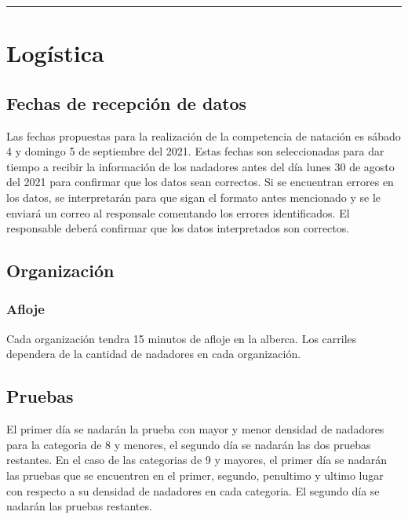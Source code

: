 \hrule
\vspace{0.5cm}
\section{Logística}
\subsection{Fechas de recepción de datos}
Las fechas propuestas para la realización de la competencia de natación es sábado 4 y domingo 5 de septiembre del 2021. Estas fechas son seleccionadas para dar tiempo a recibir la información de los nadadores antes del día lunes 30 de agosto del 2021 para confirmar que los datos sean correctos. Si se encuentran errores en los datos, se interpretarán para que sigan el formato antes mencionado y se le enviará un correo al responsale comentando los errores identificados. El responsable deberá confirmar que los datos interpretados son correctos.

\subsection{Organización}
\subsubsection{Afloje}
Cada organización tendra 15 minutos de afloje en la alberca. Los carriles dependera de la cantidad de nadadores en cada organización.

\subsection{Pruebas}
El primer día se nadarán la prueba con mayor y menor densidad de nadadores para la categoria de 8 y menores, el segundo día se nadarán las dos pruebas restantes. En el caso de las categorias de 9 y mayores, el primer día se nadarán las pruebas que se encuentren en el primer, segundo, penultimo y ultimo lugar con respecto a su densidad de nadadores en cada categoria. El segundo día se nadarán las pruebas restantes.
